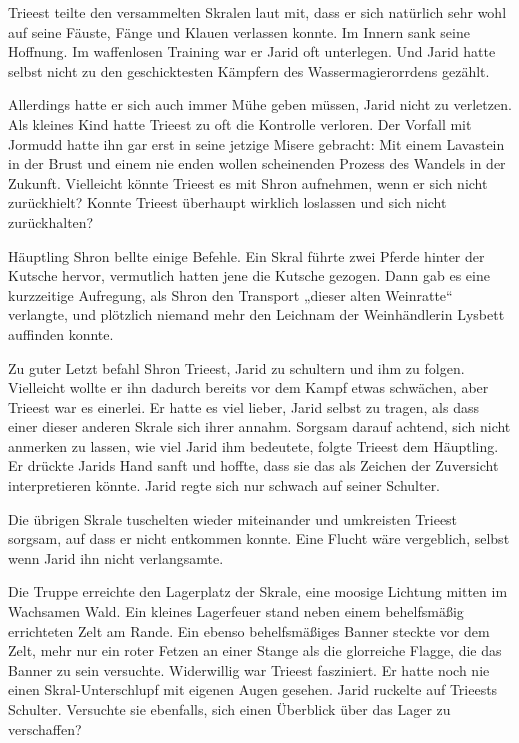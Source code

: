 Trieest teilte den versammelten Skralen laut mit, dass er sich natürlich sehr wohl auf seine Fäuste, Fänge und Klauen verlassen konnte. Im Innern sank seine Hoffnung. Im waffenlosen Training war er Jarid oft unterlegen. Und Jarid hatte selbst nicht zu den geschicktesten Kämpfern des Wassermagierorrdens gezählt.

Allerdings hatte er sich auch immer Mühe geben müssen, Jarid nicht zu verletzen. Als kleines Kind hatte Trieest zu oft die Kontrolle verloren. Der Vorfall mit Jormudd hatte ihn gar erst in seine jetzige Misere gebracht: Mit einem Lavastein in der Brust und einem nie enden wollen scheinenden Prozess des Wandels in der Zukunft. Vielleicht könnte Trieest es mit Shron aufnehmen, wenn er sich nicht zurückhielt? Konnte Trieest überhaupt wirklich loslassen und sich nicht zurückhalten?

Häuptling Shron bellte einige Befehle. Ein Skral führte zwei Pferde hinter der Kutsche hervor, vermutlich hatten jene die Kutsche gezogen. Dann gab es eine kurzzeitige Aufregung, als Shron den Transport „dieser alten Weinratte“ verlangte, und plötzlich niemand mehr den Leichnam der Weinhändlerin Lysbett auffinden konnte.

Zu guter Letzt befahl Shron Trieest, Jarid zu schultern und ihm zu folgen. Vielleicht wollte er ihn dadurch bereits vor dem Kampf etwas schwächen, aber Trieest war es einerlei. Er hatte es viel lieber, Jarid selbst zu tragen, als dass einer dieser anderen Skrale sich ihrer annahm. Sorgsam darauf achtend, sich nicht anmerken zu lassen, wie viel Jarid ihm bedeutete, folgte Trieest dem Häuptling. Er drückte Jarids Hand sanft und hoffte, dass sie das als Zeichen der Zuversicht interpretieren könnte. Jarid regte sich nur schwach auf seiner Schulter.

Die übrigen Skrale tuschelten wieder miteinander und umkreisten Trieest sorgsam, auf dass er nicht entkommen konnte. Eine Flucht wäre vergeblich, selbst wenn Jarid ihn nicht verlangsamte.

Die Truppe erreichte den Lagerplatz der Skrale, eine moosige Lichtung mitten im Wachsamen Wald. Ein kleines Lagerfeuer stand neben einem behelfsmäßig errichteten Zelt am Rande. Ein ebenso behelfsmäßiges Banner steckte vor dem Zelt, mehr nur ein roter Fetzen an einer Stange als die glorreiche Flagge, die das Banner zu sein versuchte. Widerwillig war Trieest fasziniert. Er hatte noch nie einen Skral-Unterschlupf mit eigenen Augen gesehen. Jarid ruckelte auf Trieests Schulter. Versuchte sie ebenfalls, sich einen Überblick über das Lager zu verschaffen?

